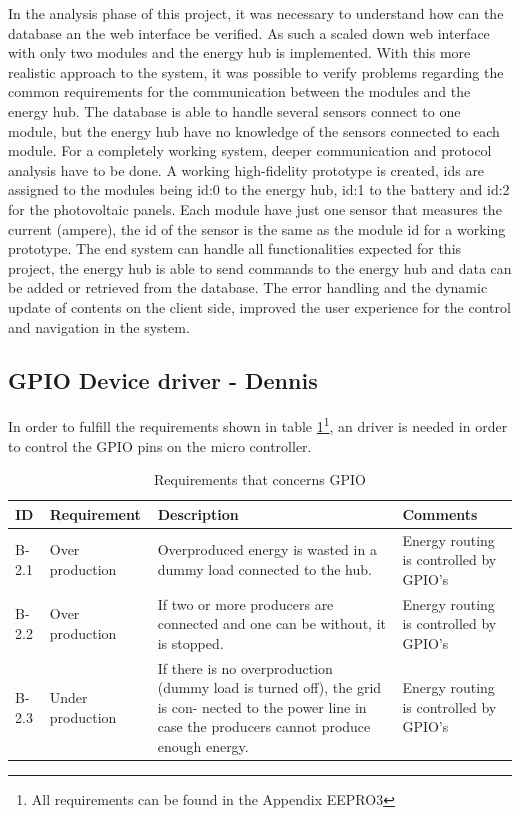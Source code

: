 In the analysis phase of this project, it was necessary to understand how can the database an the web interface be verified. As such a scaled down web interface with only two modules and the energy hub is implemented.
\p
With this more realistic approach to the system, it was possible to verify problems regarding the common requirements for the communication between the modules and the energy hub. The database is able to handle several sensors connect to one module, but the energy hub have no knowledge of the sensors connected to each module. For a completely working system, deeper communication and protocol analysis have to be done.
\p
A working high-fidelity prototype is created, ids are assigned to the modules being id:0 to the energy hub, id:1 to the battery and id:2 for the photovoltaic panels. Each module have just one sensor that measures the current (ampere), the id of the sensor is the same as the module id for a working prototype.
\p
The end system can handle all functionalities expected for this project, the energy hub is able to send commands to the energy hub and data can be added or retrieved from the database. The error handling and the dynamic update of contents on the client side, improved the user experience for the control and navigation in the system.
\subsection{GPIO Device driver - Dennis}
In order to fulfill the requirements shown in table \ref{tab:gpio_req}\footnote{All requirements can be found in the Appendix EEPRO3}, an driver is needed in order to control the GPIO pins on the micro controller. 
\begin{table}[H]
\centering
	\begin{tabular}{|p{1.2cm}|p{2.8cm}|p{8cm}|p{3.5cm}|}
	\hline
	ID		& Requirement		& Description												& Comments\\\hline
	B-2.1	& Over production & Overproduced energy is wasted in a dummy load connected to the hub. & Energy routing is controlled by GPIO's \\\hline
	B-2.2	& Over production & If two or more producers are connected and one can be without, it is stopped. & Energy routing is controlled by GPIO's \\\hline
	B-2.3	& Under production & If there is no overproduction (dummy load is turned off), the grid is con- nected to the power line in case the producers cannot produce enough energy. & Energy routing is controlled by GPIO's \\\hline
	\end{tabular}
	\caption{Requirements that concerns GPIO}
	\label{tab:gpio_req}
\end{table}
%

